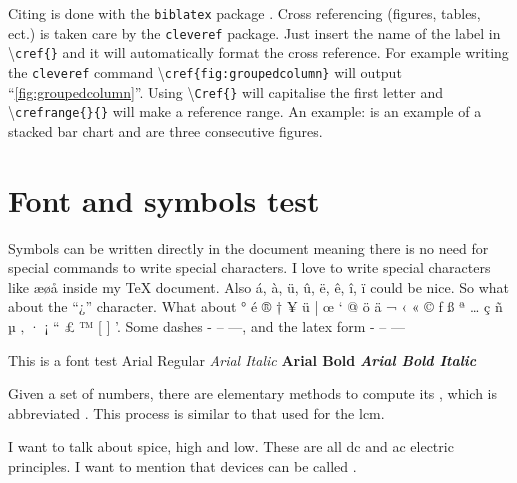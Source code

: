 Citing is done with the \texttt{biblatex} package \cite{biblatex}. Cross referencing (figures, tables, ect.) is taken care by the \texttt{cleveref} package. Just insert the name of the label in \textbackslash \texttt{cref\{\}} and it will automatically format the cross reference. For example writing the \texttt{cleveref} command \textbackslash \texttt{cref\{fig:groupedcolumn\}} will output ``\cref{fig:groupedcolumn}''. Using \textbackslash \texttt{Cref\{\}} will capitalise the first letter and \textbackslash \texttt{crefrange\{\}\{\}} will make a reference range. An example:  is an example of a stacked bar chart and  are three consecutive figures.

\section{Font and symbols test}
Symbols can be written directly in the document meaning there is no need for special commands to write special characters. I love to write special characters like æøå inside my \TeX{} document. Also á, à, ü, û, ë, ê, î, ï could be nice. So what about the ``¿'' character. What about ° é ® † ¥ ü | œ ‘ @ ö ä ¬ ‹ « © ƒ ß ª … ç ñ µ ‚ · ¡ “ £ ™ [ ] '. Some dashes - – —, and the latex form - -- --- 

This is a font test \newline 
Arial Regular \newline 
\textit{Arial Italic} \newline 
\textbf{Arial Bold} \newline 
\textbf{\textit{Arial Bold Italic}}


Given a set of numbers, there are elementary methods to compute 
its , which is abbreviated . This 
process is similar to that used for the \acrfull{lcm}.

I want to talk about \gls{spice}, \gls{high} and \gls{low}. These are all \gls{dc} and \gls{ac} electric principles. I want to mention that  devices can be called .